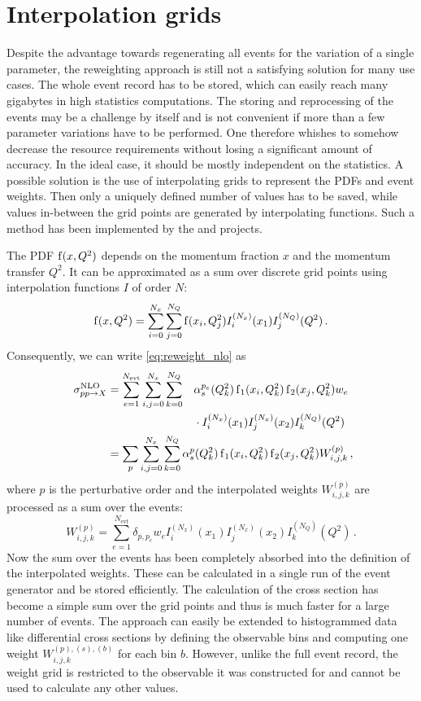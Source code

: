 \section{Interpolation grids}
Despite the advantage towards regenerating all events for the variation of a single parameter, the reweighting approach is still not a satisfying solution for many use cases.
The whole event record has to be stored, which can easily reach many gigabytes in high statistics computations.
The storing and reprocessing of the events may be a challenge by itself and is not convenient if more than a few parameter variations have to be performed.
One therefore whishes to somehow decrease the resource requirements without losing a significant amount of accuracy.
In the ideal case, it should be mostly independent on the statistics.
A possible solution is the use of interpolating grids to represent the PDFs and event weights.
Then only a uniquely defined number of values has to be saved, while values in-between the grid points are generated by interpolating functions.
Such a method has been implemented by the \appl{} \cite{applgrid2010} and \fnlo{} \cite{fastnlo2006,fastnlo2011} projects.

The PDF $\operatorname{f}(x,Q^2)$ depends on the momentum fraction $x$ and the momentum transfer $Q^2$.
It can be approximated as a sum over discrete grid points using interpolation functions $I$ of order $N$:
%
\begin{equation}
	\operatorname{f}(x,Q^2) = \sum_{i=0}^{N_x} \sum_{j=0}^{N_Q} \operatorname{f}(x_i,Q_j^2) I_i^{(N_x)}(x_1) I_j^{(N_Q)}(Q^2) \, .
\end{equation}
%
Consequently, we can write \cref{eq:reweight_nlo} as
%
\begin{alignat}{3}
  \sigma^\text{NLO}_{pp \rightarrow X}	&= \sum_{e=1}^{N_\text{evt}} \sum_{i,j=0}^{N_x} \sum_{k=0}^{N_Q} &&\alpha_s^{p_e}(Q_k^2) \pdf_1(x_i,Q_k^2) \pdf_2(x_j,Q_k^2) w_e \nonumber \\
  										&	&&\cdot I_i^{(N_x)}(x_1) I_j^{(N_x)}(x_2) I_k^{(N_Q)}(Q^2) \nonumber \\
  										&= \mathrlap{\sum_p \sum_{i,j=0}^{N_x} \sum_{k=0}^{N_Q} \alpha_s^p(Q_k^2) \pdf_1(x_i,Q_k^2) \pdf_2(x_j,Q_k^2) W_{i,j,k}^{(p)} \, ,}
\end{alignat}
%
where $p$ is the perturbative order and the interpolated weights $W_{i,j,k}^{(p)}$ are processed as a sum over the events:
\begin{equation}
	W_{i,j,k}^{(p)} = \sum_{e=1}^{N_\text{evt}} \delta_{p,p_e} w_e I_i^{(N_x)}(x_1) I_j^{(N_x)}(x_2) I_k^{(N_Q)}(Q^2) \, .
\end{equation}
%
Now the sum over the events has been completely absorbed into the definition of the interpolated weights.
These can be calculated in a single run of the event generator and be stored efficiently.
The calculation of the cross section has become a simple sum over the grid points and thus is much faster for a large number of events.
The approach can easily be extended to histogrammed data like differential cross sections by defining the observable bins and computing one weight $W_{i,j,k}^{(p),(s),(b)}$ for each bin $b$.
However, unlike the full event record, the weight grid is restricted to the observable it was constructed for and cannot be used to calculate any other values.


